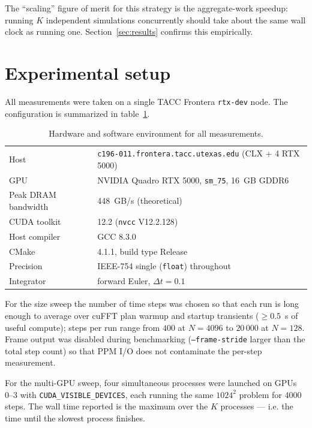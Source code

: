 \documentclass[11pt]{article}
\begin{document}
The ``scaling'' figure of merit for this strategy is the
aggregate-work speedup: running $K$ independent simulations
concurrently should take about the same wall clock as running one.
Section~\ref{sec:results} confirms this empirically.

\section{Experimental setup}
\label{sec:setup}

All measurements were taken on a single TACC Frontera
\texttt{rtx-dev} node. The configuration is summarized in
table~\ref{tab:setup}.

\begin{table}[h]
\centering
\caption{Hardware and software environment for all measurements.}
\label{tab:setup}
\begin{tabular}{@{}ll@{}}
\toprule
Host & \texttt{c196-011.frontera.tacc.utexas.edu} (CLX + 4 RTX 5000) \\
GPU & NVIDIA Quadro RTX 5000, \texttt{sm\_75}, \SI{16}{GB} GDDR6 \\
Peak DRAM bandwidth & \SI{448}{GB/s} (theoretical)~\cite{quadrortx5000} \\
CUDA toolkit & 12.2 (\texttt{nvcc} V12.2.128) \\
Host compiler & GCC 8.3.0 \\
CMake & 4.1.1, build type Release \\
Precision & IEEE-754 single (\texttt{float}) throughout \\
Integrator & forward Euler, $\Delta t = 0.1$ \\
\bottomrule
\end{tabular}
\end{table}

For the size sweep the number of time steps was chosen so that each
run is long enough to average over cuFFT plan warmup and startup
transients ($\geq 0.5$~\si{\second} of useful compute); steps per run
range from $400$ at $N = 4096$ to $20\,000$ at $N = 128$. Frame
output was disabled during benchmarking (\texttt{--frame-stride}
larger than the total step count) so that PPM I/O does not
contaminate the per-step measurement.

For the multi-GPU sweep, four simultaneous processes were launched on
GPUs 0--3 with \texttt{CUDA\_VISIBLE\_DEVICES}, each running the same
$1024^{2}$ problem for 4000 steps. The wall time reported is the
maximum over the $K$ processes --- i.e. the time until the slowest
process finishes.
\end{document}

